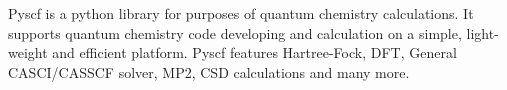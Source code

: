 Pyscf is a python library for purposes of quantum chemistry calculations. It supports quantum chemistry code developing and calculation on a simple, light-weight and efficient platform. Pyscf features Hartree-Fock, DFT, General CASCI/CASSCF solver, MP2, CSD calculations and many more. 
